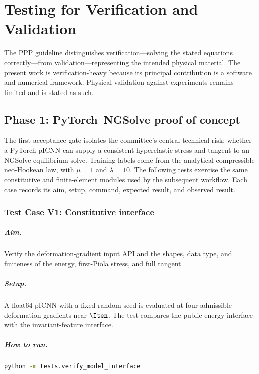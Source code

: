 \chapter{Testing for Verification and Validation}
\label{ch:verification}

The PPP guideline distinguishes verification---solving the stated equations
correctly---from validation---representing the intended physical material.
The present work is verification-heavy because its principal contribution is
a software and numerical framework. Physical validation against experiments
remains limited and is stated as such.

\section{Phase 1: PyTorch--NGSolve proof of concept}

The first acceptance gate isolates the committee's central technical risk:
whether a PyTorch pICNN can supply a consistent hyperelastic stress and
tangent to an NGSolve equilibrium solve. Training labels come from the
analytical compressible neo-Hookean law, with \(\mu=1\) and \(\lambda=10\).
The following tests exercise the same constitutive and finite-element modules
used by the subsequent workflow. Each case records its aim, setup, command,
expected result, and observed result.

\subsection*{Test Case V1: Constitutive interface}
\paragraph{Aim.}
Verify the deformation-gradient input API and the shapes, data type, and
finiteness of the energy, first-Piola stress, and full tangent.

\paragraph{Setup.}
A float64 pICNN with a fixed random seed is evaluated at four admissible
deformation gradients near \(\Iten\). The test compares the public energy
interface with the invariant-feature interface.

\paragraph{How to run.}
\begin{lstlisting}[language=bash]
python -m tests.verify_model_interface
\end{lstlisting}

